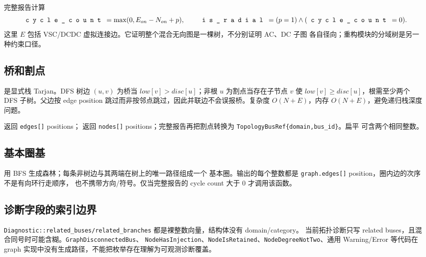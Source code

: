 完整报告计算
\begin{equation}
\fld{cycle\_count}=\max(0,E_{on}-N_{on}+p),\qquad
\fld{is\_radial}=(p=1)\land(\fld{cycle\_count}=0).
\end{equation}
这里 $E$ 包括 VSC/DCDC 虚拟连接边。它证明整个混合无向图是一棵树，不分别证明 AC、DC 子图
各自径向；重构模块的分域树是另一种约束口径。

\subsection{桥和割点}

 是显式栈 Tarjan。DFS 树边 $(u,v)$ 为桥当
$low[v]>disc[u]$；非根 $u$ 为割点当存在子节点 $v$ 使 $low[v]\ge disc[u]$，根需至少两个 DFS
子树。父边按 edge position 跳过而非按邻点跳过，因此并联边不会误报桥。复杂度
$O(N+E)$，内存 $O(N+E)$，避免递归栈深度问题。

 返回 \texttt{edges[]} positions；
 返回 \texttt{nodes[]} positions；完整报告再把割点转换为
\texttt{TopologyBusRef\{domain,bus\_id\}}。扁平  可含两个相同整数。

\subsection{基本圈基}

 用 BFS 生成森林；每条非树边与其两端在树上的唯一路径组成一个
基本圈。输出的每个整数都是 \texttt{graph.edges[]} position，圈内边的次序不是有向环行走顺序，
也不携带方向/符号。仅当完整报告的 cycle count 大于 0 才调用该函数。

\subsection{诊断字段的索引边界}

\texttt{Diagnostic::related\_buses/related\_branches} 都是裸整数向量，结构体没有 domain/category。
当前拓扑诊断只写 related buses，且混合同号时可能含糊。\texttt{GraphDisconnectedBus}、
\texttt{NodeHasInjection}、\texttt{NodeIsRetained}、\texttt{NodeDegreeNotTwo}、通用 Warning/Error
等代码在 graph 实现中没有生成路径，不能把枚举存在理解为可观测诊断覆盖。
